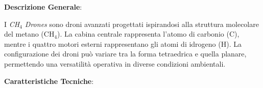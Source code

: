 \vspace{0.5cm}

\begin{tcolorbox}[fontupper=\tiny, fontlower=\Large,colback=white,colframe=black,title=\textbf{CH$_4$ Drones} (\emph{Droni Molecolari di Metano} pt.1)]
\begin{multicols}{2}
\textbf{Descrizione Generale}:

I \emph{CH$_4$ Drones} sono droni avanzati progettati ispirandosi alla struttura molecolare del metano (CH$_4$). La cabina centrale rappresenta l'atomo di carbonio (C), mentre i quattro motori esterni rappresentano gli atomi di idrogeno (H). La configurazione dei droni può variare tra la forma tetraedrica e quella planare, permettendo una versatilità operativa in diverse condizioni ambientali.

\textbf{Caratteristiche Tecniche}:


\end{multicols}
\end{tcolorbox}
